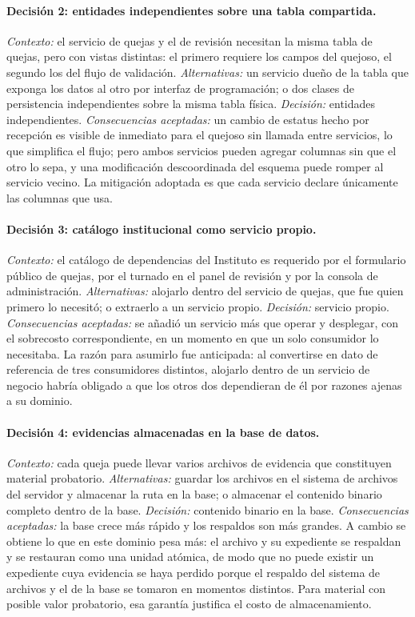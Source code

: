 	\paragraph{Decisión 2: entidades independientes sobre una tabla compartida.}
	\emph{Contexto:} el servicio de quejas y el de revisión necesitan la misma tabla de quejas, pero
	con vistas distintas: el primero requiere los campos del quejoso, el segundo los del flujo de
	validación. \emph{Alternativas:} un servicio dueño de la tabla que exponga los datos al otro por
	interfaz de programación; o dos clases de persistencia independientes sobre la misma tabla
	física. \emph{Decisión:} entidades independientes. \emph{Consecuencias aceptadas:} un cambio de
	estatus hecho por recepción es visible de inmediato para el quejoso sin llamada entre servicios,
	lo que simplifica el flujo; pero ambos servicios pueden agregar columnas sin que el otro lo
	sepa, y una modificación descoordinada del esquema puede romper al servicio vecino. La mitigación
	adoptada es que cada servicio declare únicamente las columnas que usa.
	
	\paragraph{Decisión 3: catálogo institucional como servicio propio.}
	\emph{Contexto:} el catálogo de dependencias del Instituto es requerido por el formulario público
	de quejas, por el turnado en el panel de revisión y por la consola de administración.
	\emph{Alternativas:} alojarlo dentro del servicio de quejas, que fue quien primero lo necesitó;
	o extraerlo a un servicio propio. \emph{Decisión:} servicio propio.
	\emph{Consecuencias aceptadas:} se añadió un servicio más que operar y desplegar, con el
	sobrecosto correspondiente, en un momento en que un solo consumidor lo necesitaba. La razón para
	asumirlo fue anticipada: al convertirse en dato de referencia de tres consumidores distintos,
	alojarlo dentro de un servicio de negocio habría obligado a que los otros dos dependieran de él
	por razones ajenas a su dominio.
	
	\paragraph{Decisión 4: evidencias almacenadas en la base de datos.}
	\emph{Contexto:} cada queja puede llevar varios archivos de evidencia que constituyen material
	probatorio. \emph{Alternativas:} guardar los archivos en el sistema de archivos del servidor y
	almacenar la ruta en la base; o almacenar el contenido binario completo dentro de la base.
	\emph{Decisión:} contenido binario en la base. \emph{Consecuencias aceptadas:} la base crece más
	rápido y los respaldos son más grandes. A cambio se obtiene lo que en este dominio pesa más: el
	archivo y su expediente se respaldan y se restauran como una unidad atómica, de modo que no puede
	existir un expediente cuya evidencia se haya perdido porque el respaldo del sistema de archivos y
	el de la base se tomaron en momentos distintos. Para material con posible valor probatorio, esa
	garantía justifica el costo de almacenamiento.
	
